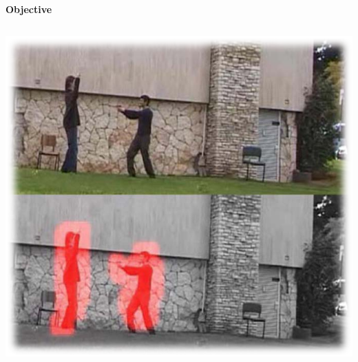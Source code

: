 \begin{frame}{\textbf{Objective}}
\begin{columns}
\begin{column}{0.38\textwidth}
			\includegraphics[width=\textwidth]{./img/example.png} \footnotemark
		\end{column}
	\end{columns}
\end{frame}


